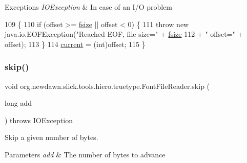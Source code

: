 \begin{DoxyExceptions}{Exceptions}
{\em I\+O\+Exception} & In case of an I/O problem \\
\hline
\end{DoxyExceptions}

\begin{DoxyCode}
109                                                         \{
110         \textcolor{keywordflow}{if} (offset >= \mbox{\hyperlink{classorg_1_1newdawn_1_1slick_1_1tools_1_1hiero_1_1truetype_1_1_font_file_reader_a247fb2663cf669a7842919c405f41bfe}{fsize}} || offset < 0) \{
111             \textcolor{keywordflow}{throw} \textcolor{keyword}{new} java.io.EOFException(\textcolor{stringliteral}{"Reached EOF, file size="} + \mbox{\hyperlink{classorg_1_1newdawn_1_1slick_1_1tools_1_1hiero_1_1truetype_1_1_font_file_reader_a247fb2663cf669a7842919c405f41bfe}{fsize}}
112                                            + \textcolor{stringliteral}{" offset="} + offset);
113         \}
114         \mbox{\hyperlink{classorg_1_1newdawn_1_1slick_1_1tools_1_1hiero_1_1truetype_1_1_font_file_reader_ab082d04b7f0a287496055b8e5f203cb4}{current}} = (int)offset;
115     \}
\end{DoxyCode}
\mbox{\label{classorg_1_1newdawn_1_1slick_1_1tools_1_1hiero_1_1truetype_1_1_font_file_reader_a659cc8eebfd55a1b1816481cca64688b}} 
\subsubsection{\texorpdfstring{skip()}{skip()}}
{\footnotesize\ttfamily void org.\+newdawn.\+slick.\+tools.\+hiero.\+truetype.\+Font\+File\+Reader.\+skip (\begin{DoxyParamCaption}\item[{long}]{add }\end{DoxyParamCaption}) throws I\+O\+Exception\hspace{0.3cm}{\ttfamily [inline]}}

Skip a given number of bytes.


\begin{DoxyParams}{Parameters}
{\em add} & The number of bytes to advance \\
\hline
\end{DoxyParams}

